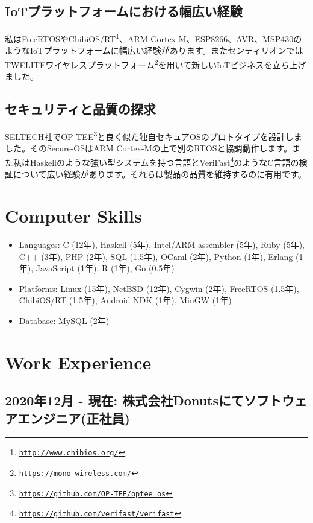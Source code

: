 \documentclass[letterpaper]{article}
\begin{document}
\subsection*{IoTプラットフォームにおける幅広い経験}

私はFreeRTOSやChibiOS/RT\footnote{\href{http://www.chibios.org/}{\tt http://www.chibios.org/}}、ARM Cortex-M、ESP8266、AVR、MSP430のようなIoTプラットフォームに幅広い経験があります。またセンティリオンではTWELITEワイヤレスプラットフォーム\footnote{\href{https://mono-wireless.com/}{\tt https://mono-wireless.com/}}を用いて新しいIoTビジネスを立ち上げました。

\subsection*{セキュリティと品質の探求}

SELTECH社でOP-TEE\footnote{\href{https://github.com/OP-TEE/optee\_os}{\tt https://github.com/OP-TEE/optee\_os}}と良く似た独自セキュアOSのプロトタイプを設計しました。そのSecure-OSはARM Cortex-Mの上で別のRTOSと協調動作します。また私はHaskellのような強い型システムを持つ言語とVeriFast\footnote{\href{https://github.com/verifast/verifast}{\tt https://github.com/verifast/verifast}}のようなC言語の検証について広い経験があります。それらは製品の品質を維持するのに有用です。

\section*{Computer Skills}

\begin{itemize}
  \item Languages: C (12年), Haskell (5年), Intel/ARM assembler (5年), Ruby (5年), C++ (3年), PHP (2年), SQL (1.5年), OCaml (2年), Python (1年), Erlang (1年), JavaScript (1年), R (1年), Go (0.5年)
  \item Platforms: Linux (15年), NetBSD (12年), Cygwin (2年), FreeRTOS (1.5年), ChibiOS/RT (1.5年), Android NDK (1年), MinGW (1年)
  \item Database: MySQL (2年)
\end{itemize}

\newpage

\section*{Work Experience}

\subsection*{2020年12月 - 現在: 株式会社Donutsにてソフトウェアエンジニア(正社員)}
\end{document}
